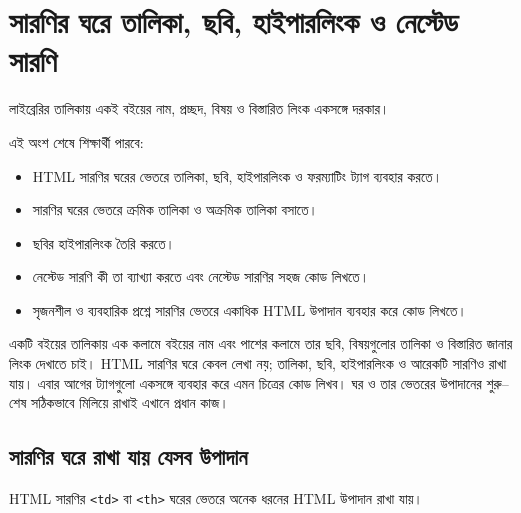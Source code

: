\section{সারণির ঘরে তালিকা, ছবি, হাইপারলিংক ও নেস্টেড সারণি}

লাইব্রেরির তালিকায় একই বইয়ের নাম, প্রচ্ছদ, বিষয় ও বিস্তারিত লিংক একসঙ্গে দরকার।



\begin{learningbox}
এই অংশ শেষে শিক্ষার্থী পারবে:
\begin{itemize}
\item HTML সারণির ঘরের ভেতরে তালিকা, ছবি, হাইপারলিংক ও ফরম্যাটিং ট্যাগ ব্যবহার করতে।
\item সারণির ঘরের ভেতরে ক্রমিক তালিকা ও অক্রমিক তালিকা বসাতে।
\item ছবির হাইপারলিংক তৈরি করতে।
\item নেস্টেড সারণি কী তা ব্যাখ্যা করতে এবং নেস্টেড সারণির সহজ কোড লিখতে।
\item সৃজনশীল ও ব্যবহারিক প্রশ্নে সারণির ভেতরে একাধিক HTML উপাদান ব্যবহার করে কোড লিখতে।
\end{itemize}
\end{learningbox}



একটি বইয়ের তালিকায় এক কলামে বইয়ের নাম এবং পাশের কলামে তার ছবি, বিষয়গুলোর তালিকা ও বিস্তারিত জানার লিংক দেখাতে চাই। HTML সারণির ঘরে কেবল লেখা নয়; তালিকা, ছবি, হাইপারলিংক ও আরেকটি সারণিও রাখা যায়। এবার আগের ট্যাগগুলো একসঙ্গে ব্যবহার করে এমন চিত্রের কোড লিখব। ঘর ও তার ভেতরের উপাদানের শুরু--শেষ সঠিকভাবে মিলিয়ে রাখাই এখানে প্রধান কাজ।

\subsection{সারণির ঘরে রাখা যায় যেসব উপাদান}

HTML সারণির \texttt{<td>} বা \texttt{<th>} ঘরের ভেতরে অনেক ধরনের HTML উপাদান রাখা যায়।

